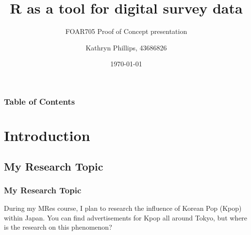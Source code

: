 \documentclass[aspectratio=1610]{beamer}
\title{R as a tool for digital survey data}
\subtitle{FOAR705 Proof of Concept presentation}
\author{Kathryn Phillips, 43686826}
\institute{Macquarie University}
\date{\today}
\begin{document}
\begin{frame}
\titlepage
\end{frame}

\begin{frame}
\frametitle{Table of Contents}
\tableofcontents
\end{frame}

\section{Introduction}
\subsection{My Research Topic}
\begin{frame}
\frametitle{My Research Topic}


During my MRes course, I plan to research the influence of Korean Pop (Kpop) within Japan.
\newline
You can find advertisements for Kpop all around Tokyo, but where is the research on this phenomenon?
\newline
\newline
\centering

\end{frame}
\end{document}
